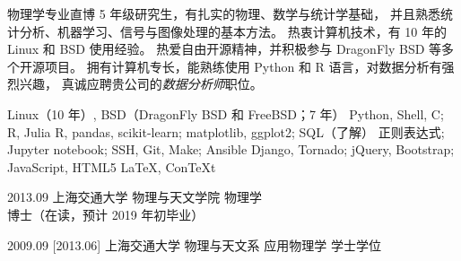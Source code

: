 \documentclass[zh]{resume}
\newcommand{\myposition}{数据分析师}
\begin{document}
\makeheader

{\onehalfspacing\hspace{1.7em}
物理学专业直博 5 年级研究生，有扎实的物理、数学与统计学基础，
并且熟悉统计分析、机器学习、信号与图像处理的基本方法。
热衷计算机技术，有 10 年的 Linux 和 BSD 使用经验。
热爱自由开源精神，并积极参与 DragonFly BSD 等多个开源项目。
拥有计算机专长，能熟练使用 Python 和 R 语言，对数据分析有强烈兴趣，
真诚应聘贵公司的\emph{\myposition}职位。
\par}  %

\begin{competences}
    {Linux（10 年）, BSD（DragonFly BSD 和 FreeBSD；7 年）}
    {Python, Shell, C; R, Julia}
    {R, pandas, scikit-learn; matplotlib, ggplot2; SQL（了解）}
    {正则表达式; Jupyter notebook; SSH, Git, Make; Ansible}
    {Django, Tornado; jQuery, Bootstrap; JavaScript, HTML5}
    {\LaTeX, Con\TeX{}t}
\end{competences}

\begin{educations}
  \education%
    {2013.09}%
    {上海交通大学}%
    {物理与天文学院}%
    {物理学}%
    {博士（在读，预计 2019 年初毕业）}

  \separator{0.7em}
  \education%
    {2009.09}%
    [2013.06]%
    {上海交通大学}%
    {物理与天文系}%
    {应用物理学}%
    {学士学位}
\end{educations}
\end{document}
